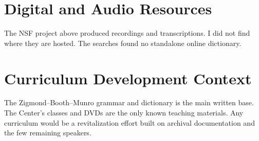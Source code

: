 \documentclass[12pt]{article}
\begin{document}
\section{Digital and Audio Resources}
The NSF project above produced recordings and transcriptions. I did not find where they are hosted. The searches found no standalone online dictionary.

\section{Curriculum Development Context}
The Zigmond--Booth--Munro grammar and dictionary is the main written base. The Center's classes and DVDs are the only known teaching materials. Any curriculum would be a revitalization effort built on archival documentation and the few remaining speakers.
\end{document}
